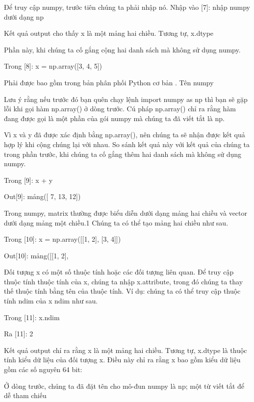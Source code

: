 Để truy cập numpy, trước tiên chúng ta phải nhập nó. Nhập vào [7]: nhập numpy dưới dạng np

Kết quả output cho thấy x là một mảng hai chiều. Tương tự, x.dtype

Phần này, khi chúng ta cố gắng cộng hai danh sách mà không sử dụng numpy.

Trong [8]: x = np.array([3, 4, 5])

Phải được bao gồm trong bản phân phối Python cơ bản . Tên numpy

Lưu ý rằng nếu trước đó bạn quên chạy lệnh import numpy as np thì bạn sẽ gặp lỗi khi gọi hàm np.array() ở dòng trước. Cú pháp np.array() chỉ ra rằng hàm đang được gọi là một phần của gói numpy mà chúng ta đã viết tắt là np.

Vì x và y đã được xác định bằng np.array(), nên chúng ta sẽ nhận được kết quả hợp lý khi cộng chúng lại với nhau. So sánh kết quả này với kết quả của chúng ta trong phần trước, khi chúng ta cố gắng thêm hai danh sách mà không sử dụng numpy.

Trong [9]: x + y

Out[9]: mảng([ 7, 13, 12])

Trong numpy, matrix thường được biểu diễn dưới dạng mảng hai chiều và vector dưới dạng mảng một chiều.1 Chúng ta có thể tạo mảng hai chiều như sau.

Trong [10]: x = np.array([[1, 2], [3, 4]])

Out[10]: mảng([[1, 2],

Đối tượng x có một số thuộc tính hoặc các đối tượng liên quan. Để truy cập thuộc tính thuộc tính của x, chúng ta nhập x.attribute, trong đó chúng ta thay thế thuộc tính bằng tên của thuộc tính. Ví dụ: chúng ta có thể truy cập thuộc tính ndim của x ndim như sau.

Trong [11]: x.ndim

Ra [11]: 2

Kết quả output chỉ ra rằng x là một mảng hai chiều. Tương tự, x.dtype là thuộc tính kiểu dữ liệu của đối tượng x. Điều này chỉ ra rằng x bao gồm kiểu dữ liệu gồm các số nguyên 64 bit:

Ở dòng trước, chúng ta đã đặt tên cho mô-đun numpy là np; một từ viết tắt để dễ tham chiếu

